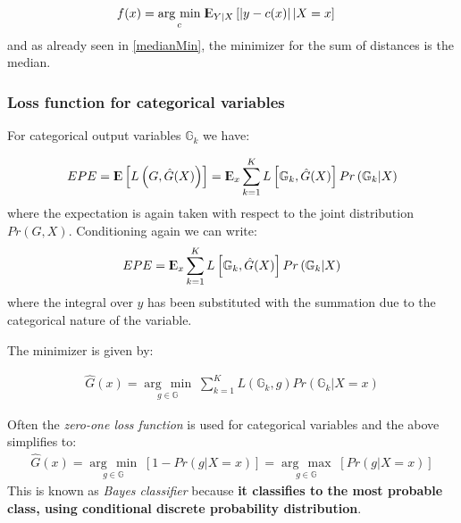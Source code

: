 \documentclass[12pt, letterpaper]{article}
\theoremstyle{definition}
\newcommand{\E}{{\rm I\kern-.3em E}}
\newcommand{\argmax}[1]{\underset{#1}{\operatorname{arg}\,\operatorname{max}}\;}
\newcommand{\argmin}[1]{\underset{#1}{\operatorname{arg}\,\operatorname{min}}\;}
\begin{document}
\begin{equation}
\begin{aligned}
f(x) &= \argmin{c} \E_{Y|X} \left[ \left| y - c(x) \right| | X=x \right]
\end{aligned}
\end{equation}
and as already seen in \autoref{medianMin}, the minimizer for the sum of distances is the median.
\subsubsection{Loss function for categorical variables}
For categorical output variables $\mathbb{G}_k$ we have: 

\begin{equation}
\begin{aligned}
EPE = \E\left[ L\left( G, \hat{G}(X)\right)\right] = \E_x \sum_{k=1}^K L\left[ \mathbb{G}_k, \hat{G}(X)\right]Pr\left( \mathbb{G}_k|X\right)
\end{aligned}
\end{equation}
where the expectation is again taken with respect to the joint distribution $Pr(G,X)$. Conditioning again we can write:
\begin{equation}
\begin{aligned}
EPE = \E_x \sum_{k=1}^K L\left[ \mathbb{G}_k, \hat{G}(X)\right]Pr\left( \mathbb{G}_k|X\right)
\end{aligned}
\end{equation}
where the integral over $y$ has been substituted with the summation due to the categorical nature of the variable.

The minimizer is given by:

\begin{equation}
\begin{aligned}
\hat{G}(x) = \argmin{g \in \mathbb{G}} \sum_{k=1}^{K} L\left( \mathbb{G}_k, g\right)Pr\left( \mathbb{G}_k | X=x \right)
\end{aligned}
\end{equation}

Often the \textit{zero-one loss function} is used for categorical variables and the above simplifies to:
\begin{equation}
\begin{aligned}
\hat{G}(x) = \argmin{g \in \mathbb{G}}  \left[1 - Pr\left( g | X=x \right) \right] =\argmax{g \in \mathbb{G}}  \left[Pr\left( g | X=x \right) \right]
\end{aligned}
\end{equation}
This is known as \textit{Bayes classifier} because \textbf{it classifies to the most probable class, using conditional discrete probability distribution}.
\end{document}
